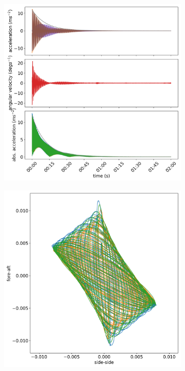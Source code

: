 \documentclass{article}
\begin{document}
\begin{figure}[ht]

    \centering
    \begin{subfigure}[b]{0.45\textwidth}
        \centering
        \includegraphics[width=\textwidth]{../results/experiment/low_mass_acceleration.png}
        \caption{}
        \label{fig:low-mass:acc}
    \end{subfigure}
    \begin{subfigure}[b]{0.45\textwidth}
        \centering
        \includegraphics[width=\textwidth]{../results/experiment/low_mass_orbit.png}

\end{subfigure}
\end{figure}
\end{document}
